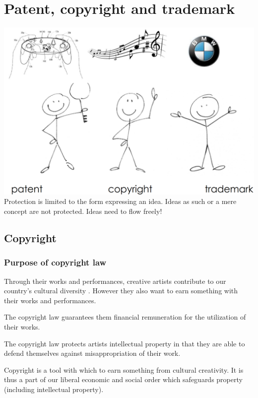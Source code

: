 \section{Patent, copyright and trademark}
\includegraphics[width=1\linewidth]{images/patent_copyright_and_trademark}
Protection is limited to the form expressing an idea. Ideas as such or a mere concept are not protected. Ideas need to flow freely!

\subsection{Copyright}
\subsubsection{Purpose of copyright law}
Through their works and performances, creative artists contribute to our country's cultural diversity . However they also want to earn something with their works and performances.
\begin{compactitem}
	\item The copyright law guarantees them financial remuneration for the utilization of their works. 
	\item The copyright law protects artists intellectual property in that they are able to defend themselves against misappropriation of their work.
	\item Copyright is a tool with which to earn something from cultural creativity. It is thus a part of our liberal economic and social order which safeguards property (including intellectual property). 
\end{compactitem}

